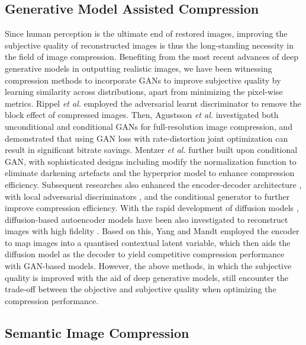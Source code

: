 \subsection{Generative Model Assisted Compression}

{Since human perception is the ultimate end of restored images, improving the subjective quality of reconstructed images is thus the long-standing necessity in the field of image compression. Benefiting from the most recent advances of deep generative models in outputting realistic images, we have been witnessing compression methods to incorporate GANs to improve subjective quality by learning similarity across distributions, apart from minimizing the pixel-wise metrics. Rippel \textit{et al.} \cite{rippel2017real} employed the adversarial learnt discriminator to remove the block effect of compressed images. Then, Agustsson \textit{et al.} \cite{agustsson2019generative} investigated both unconditional and conditional GANs for full-resolution image compression, and demonstrated that using GAN loss with rate-distortion joint optimization can result in significant bitrate savings. Mentzer \textit{et al.} \cite{mentzer2020high} further built upon conditional GAN, with sophisticated designs including modify the normalization function to eliminate darkening artefacts and the hyperprior model to enhance compression efficiency. Subsequent researches also enhanced the encoder-decoder architecture \cite{he2022po}, with local adversarial discriminators \cite{muckley2023improving}, and the conditional generator \cite{agustsson2023multi} to further improve compression efficiency. With the rapid development of diffusion models \cite{ho2020denoising,song2020denoising}, diffusion-based autoencoder models have been also investigated to reconstruct images with high fidelity \cite{preechakul2022diffusion}. Based on this, Yang and Mandt \cite{yang2024lossy} employed the encoder to map images into a quantised contextual latent variable, which then aids the diffusion model as the decoder to yield competitive compression performance with GAN-based models. However, the above methods, in which the subjective quality is improved with the aid of deep generative models, still encounter the trade-off between the objective and subjective quality when optimizing the compression performance. }


\subsection{Semantic Image Compression}


